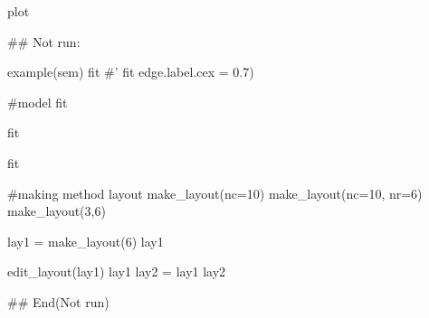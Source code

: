 \documentclass[a4paper]{book}
\begin{document}
%
\begin{Value}
plot
\end{Value}
%
\begin{Examples}
\begin{ExampleCode}

\#\# Not run: 

example(sem)
fit%
#'
fit %
                edge.label.cex = 0.7)

#model
fit %

fit %

fit %

#making method layout
make_layout(nc=10)
make_layout(nc=10, nr=6)
make_layout(3,6)

lay1 = make_layout(6)
lay1

edit_layout(lay1)
lay1 %
lay2 = lay1 %
lay2


## End(Not run)


\end{ExampleCode}
\end{Examples}
\end{document}
